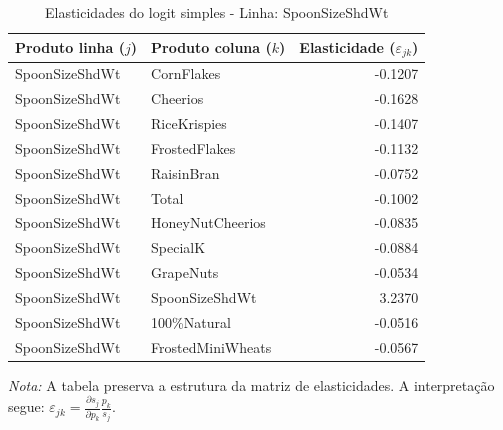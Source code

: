 \begingroup
\begin{table}[H]
\centering
\caption{Elasticidades do logit simples - Linha: SpoonSizeShdWt}
\label{tab:elas-spoonsizeshdwt}
\small
\begin{tabular}{llr}
\toprule
Produto linha ($j$) & Produto coluna ($k$) & Elasticidade ($\varepsilon_{jk}$) \\
\midrule
SpoonSizeShdWt & CornFlakes & -0.1207 \\
SpoonSizeShdWt & Cheerios & -0.1628 \\
SpoonSizeShdWt & RiceKrispies & -0.1407 \\
SpoonSizeShdWt & FrostedFlakes & -0.1132 \\
SpoonSizeShdWt & RaisinBran & -0.0752 \\
SpoonSizeShdWt & Total & -0.1002 \\
SpoonSizeShdWt & HoneyNutCheerios & -0.0835 \\
SpoonSizeShdWt & SpecialK & -0.0884 \\
SpoonSizeShdWt & GrapeNuts & -0.0534 \\
SpoonSizeShdWt & SpoonSizeShdWt & 3.2370 \\
SpoonSizeShdWt & 100\%Natural & -0.0516 \\
SpoonSizeShdWt & FrostedMiniWheats & -0.0567 \\
\bottomrule
\end{tabular}

\vspace{0.3em}
\footnotesize
\textit{Nota:} A tabela preserva a estrutura da matriz de elasticidades. A interpretação segue: $\varepsilon_{jk}=\frac{\partial s_j}{\partial p_k}\frac{p_k}{s_j}$.
\end{table}
\endgroup


